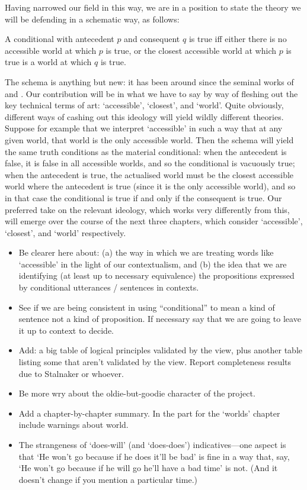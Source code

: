 \documentclass[If.tex]{subfiles}
\begin{document}
Having narrowed our field in this way, we are in a position to state the theory we will be defending in a schematic way, as follows:
\begin{prop} 
	\item
	A conditional with antecedent $p$ and consequent $q$ is true iff either there is no accessible world at which $p$ is true, or the closest accessible world at which $p$ is true is a world at which $q$ is true. 
\end{prop}
The schema is anything but new: it has been around since the seminal works of \cite{StalnakerTC} and \citet{LewisCounterfactuals}.  Our contribution will be in what we have to say by way of fleshing out the key technical terms of art: ‘accessible’, ‘closest’, and ‘world’. Quite obviously, different ways of cashing out this ideology will yield wildly different theories. Suppose for example that we interpret ‘accessible’ in such a way that at any given world, that world is the only accessible world. Then the schema will yield the same truth conditions as the material conditional: when the antecedent is false, it is false in all accessible worlds, and so the conditional is vacuously true; when the antecedent is true, the actualised world must be the closest accessible world where the antecedent is true (since it is the only accessible world), and so in that case the conditional is true if and only if the consequent is true. Our preferred take on the relevant ideology, which works very differently from this, will emerge over the course of the next three chapters, which consider ‘accessible’, ‘closest’, and ‘world’ respectively.

\begin{itemize} 
	\item Be clearer here about: (a) the way in which we are treating words like ‘accessible’ in the light of our contextualism, and (b) the idea that we are identifying (at least up to necessary equivalence) the propositions expressed by conditional utterances / sentences in contexts. 
	\item See if we are being consistent in using “conditional” to mean a kind of sentence not a kind of proposition. If necessary say that we are going to leave it up to context to decide. 
	\item Add: a big table of logical principles validated by the view, plus another table listing some that aren't validated by the view. Report completeness results due to Stalnaker or whoever. 
	\item Be more wry about the oldie-but-goodie character of the project. 
	\item
	Add a chapter-by-chapter summary.  In the part for the ‘worlds’ chapter include warnings about world.
	\item
	The strangeness of ‘does-will’ (and ‘does-does’) indicatives---one aspect is that ‘He won't go because if he does it'll be bad’ is fine in a way that, say, ‘He won't go because if he will go he'll have a bad time’ is not.  (And it doesn't change if you mention a particular time.)
\end{itemize}
\end{document}
